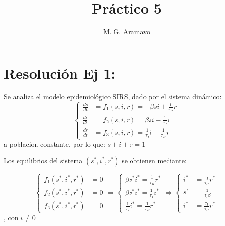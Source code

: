 \documentclass[twocolumn,aps,prl]{revtex4-1}
\begin{document}

\title{Práctico 5}
\author{M. G. Aramayo}


\maketitle



\section{Resolución Ej 1:}

Se analiza el modelo epidemiológico SIRS, dado por el sistema dinámico:
$$
\left\lbrace
\begin{aligned}
\frac{d s}{d t} & = f_1(s,i,r) = -\beta s i+\frac{1}{\tau_{R}} r \\
\frac{d i}{d t} & = f_2(s,i,r) =\beta s i-\frac{1}{\tau_{I}} i \\
\frac{d r}{d t} & = f_3(s,i,r) =\frac{1}{\tau_{I}} i-\frac{1}{\tau_{R}} r
\end{aligned}
\right.
$$
a poblacion constante, por lo que: $s+i+r =1 $

Los equilibrios del sistema $\left(s^{*}, i^{*}, r^{*}\right)$ se obtienen mediante:

$$
\left\lbrace
\begin{aligned}
f_1(s^*, i^*, r^*) &= 0  \\
f_2(s^*, i^*, r^*) &= 0  \\
f_3(s^*, i^*, r^*) &= 0
\end{aligned}
\right.
\Rightarrow
\left\lbrace
\begin{aligned}
\beta s^* i^* = \frac{1}{\tau_{R}} r^* \\
\beta s^* i^* = \frac{1}{\tau_{I}} i^* \\
\frac{1}{\tau_{I}} i^* = \frac{1}{\tau_{R}} r^*
\end{aligned}
\right.
\Rightarrow
\left\lbrace
\begin{aligned}
i^* &= \frac{\tau_{I}}{\tau_{R}} r^* \\
s^* &= \frac{1}{\tau_{I} \beta}      \\
i^* &= \frac{\tau_{I}}{\tau_{R}} r^* 
\end{aligned}
\right.
$$, con $i \neq 0$
\end{document}
